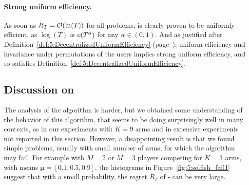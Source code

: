 

\paragraph{Strong uniform efficiency.}\label{app:5:JustifyingDefinition5}
%
As soon as $R_T = \mathop{}\mathopen{}\mathcal{O}\mathopen{}\left(\ln(T)\right)$ for all problems, \MCTopM{} is clearly proven
to be uniformly efficient, as $\log(T)$ is $\mathop{}\mathopen{}o\mathopen{}\left(T^{\alpha}\right)$ for any $\alpha\in(0,1)$.
%
And as justified after Definition~\ref{def:5:DecentralizedUniformEfficiency} (page~\pageref{def:5:DecentralizedUniformEfficiency}), uniform efficiency and invariance under permutations of the users implies strong uniform efficiency, and so \MCTopM{} satisfies Definition~\ref{def:5:DecentralizedUniformEfficiency}.
%


\subsection{Discussion on \Selfish}\label{sub:5:SelfishFails}

The analysis of the \Selfish{} algorithm is harder, but we obtained some understanding of the behavior of this algorithm, that seems to be doing surprisingly well in many contexts, as in our experiments with $K=9$ arms and in extensive experiments not reported in this section. However, a disappointing result is that we found simple problems, usually with small number of arms, for which the algorithm may fail. For example with $M=2$ or $M=3$ players competing for $K=3$ arms,
with means $\boldsymbol{\mu} = [0.1, 0.5, 0.9]$, the histograms in Figure~\ref{fig:5:selfish_fail1} suggest that with a small probability, the regret $R_T$ of \Selfish-\klUCB{} can be very large.

